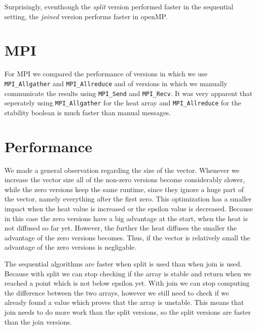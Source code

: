 \documentclass[a4paper]{article}
\begin{document}

Surprisingly, eventhough the \textit{split} version performed faster in the sequential setting, the \textit{joined} version performs faster in openMP.

\section{MPI}
For MPI we compared the performance of versions in which  we use \texttt{MPI\_Allgather}
and \texttt{MPI\_Allreduce} and of versions in which we manually communicate the results using \texttt{MPI\_Send} and \texttt{MPI\_Recv}. It was very apparent that seperately using \texttt{MPI\_Allgather} for the heat array and \texttt{MPI\_Allreduce} for the stability boolean is much faster than manual messages.


\section{Performance}
We made a general observation regarding the size of the vector. Whenever we increase the vector size all of the non-zero versions become considerably slower, while the zero versions keep the same runtime, since they ignore a huge part of the vector, namely everything after the first zero. This optimization has a smaller impact when the heat value is increased or the epsilon value is decreased. Because in this case the zero versions have a big advantage at the start, when the heat is not diffused so far yet. However, the further the heat diffuses the smaller the advantage of the zero versions becomes. Thus, if the vector is relatively small the advantage of the zero versions is negligable.

The sequential algorithms are faster when split is used than when join is used. Because with split we can stop checking if the array is stable and return when we reached a point which is not below epsilon yet. With join we can stop computing the difference between the two arrays, however we still need to check if we already found a value which proves that the array is unstable. This means that join needs to do more work than the split versions, so the split versions are faster than the join versions.
\end{document}

